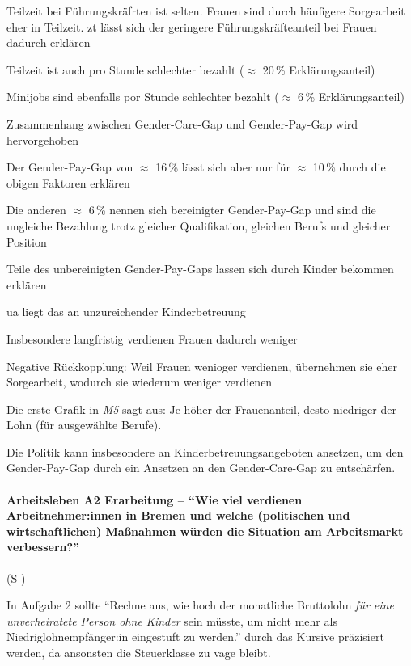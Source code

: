 \begin{myitemize}
\begin{myitemize}
        \item Teilzeit bei Führungskräfrten ist selten. Frauen sind durch häufigere Sorgearbeit eher in Teilzeit. \Gls{zt} lässt sich der geringere Führungskräfteanteil bei Frauen dadurch erklären
        \item Teilzeit ist auch pro Stunde schlechter bezahlt ($\approx$ 20\,\% Erklärungsanteil)
        \item Minijobs sind ebenfalls por Stunde schlechter bezahlt ($\approx$ 6\,\% Erklärungsanteil)
    \end{myitemize}
    \item Zusammenhang zwischen Gender-Care-Gap und Gender-Pay-Gap wird hervorgehoben
    \item Der Gender-Pay-Gap von $\approx$ 16\,\% lässt sich aber nur für $\approx$ 10\,\% durch die obigen Faktoren erklären
    \item Die anderen $\approx$ 6\,\% nennen sich bereinigter Gender-Pay-Gap und sind die ungleiche Bezahlung trotz gleicher Qualifikation, gleichen Berufs und gleicher Position
    \item Teile des unbereinigten Gender-Pay-Gaps lassen sich durch Kinder bekommen erklären
    \item \Gls{ua} liegt das an unzureichender Kinderbetreuung
    \item Insbesondere langfristig verdienen Frauen dadurch weniger
    \item Negative Rückkopplung: Weil Frauen wenioger verdienen, übernehmen sie eher Sorgearbeit, wodurch sie wiederum weniger verdienen
\end{myitemize}

\noindent Die erste Grafik in \emph{M5} sagt aus: Je höher der Frauenanteil, desto niedriger der Lohn (für ausgewählte Berufe).

\noindent Die Politik kann insbesondere an Kinderbetreuungsangeboten ansetzen, um den Gender-Pay-Gap durch ein Ansetzen an den Gender-Care-Gap zu entschärfen. 



\paragraph{Arbeitsleben A2 Erarbeitung -- \enquote{Wie viel verdienen Arbeitnehmer:innen in Bremen und welche (politischen und wirtschaftlichen) Maßnahmen würden die Situation am Arbeitsmarkt verbessern?}}  (\gls{S} \pageref{ARBEITSLEBEN-A2})

In Aufgabe 2 sollte \enquote{Rechne aus, wie hoch der monatliche Bruttolohn \emph{für eine unverheiratete Person ohne Kinder} sein müsste, um nicht mehr als Niedriglohnempfänger:in eingestuft zu werden.} durch das Kursive präzisiert werden, da ansonsten die Steuerklasse zu vage bleibt. 

